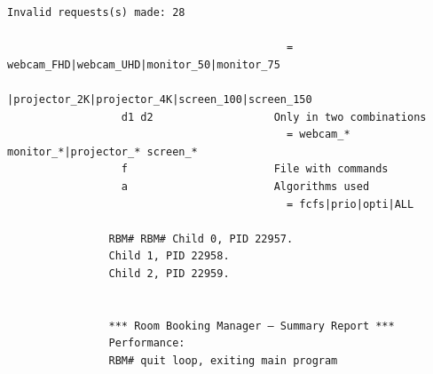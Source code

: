 \documentclass{article}
\begin{document}
\begin{Verbatim}[gobble=8]
                    Invalid requests(s) made: 28
                
                                            = webcam_FHD|webcam_UHD|monitor_50|monitor_75     
                                              |projector_2K|projector_4K|screen_100|screen_150
                  d1 d2                   Only in two combinations                            
                                            = webcam_* monitor_*|projector_* screen_*         
                  f                       File with commands                                  
                  a                       Algorithms used                                     
                                            = fcfs|prio|opti|ALL                              
                
                RBM# RBM# Child 0, PID 22957.
                Child 1, PID 22958.
                Child 2, PID 22959.
                
                
                *** Room Booking Manager – Summary Report ***
                Performance:
                RBM# quit loop, exiting main program
                
            \end{Verbatim}
\end{document}
